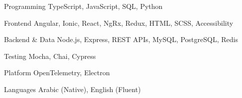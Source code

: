

\begin{cvskills}


  \cvskill
    {Programming} %
    {TypeScript, JavaScript, SQL, Python} %

  \cvskill
    {Frontend} %
    {Angular, Ionic, React, NgRx, Redux, HTML, SCSS, Accessibility} %

  \cvskill
    {Backend \& Data} %
    {Node.js, Express, REST APIs, MySQL, PostgreSQL, Redis} %

  \cvskill
    {Testing} %
    {Mocha, Chai, Cypress} %

  \cvskill
    {Platform} %
    {OpenTelemetry, Electron} %

  \cvskill
    {Languages} %
    {Arabic (Native), English (Fluent)} %


\vspace{2pt}
\end{cvskills}

